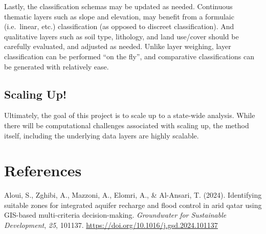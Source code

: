 \documentclass[
]{agujournal2019}
\newlength{\cslhangindent}
\newenvironment{CSLReferences}[2] %
 {\begin{list}{}{%
  \setlength{\itemindent}{0pt}
  \setlength{\leftmargin}{0pt}
  \setlength{\parsep}{0pt}
  \ifodd #1
   \setlength{\leftmargin}{\cslhangindent}
   \setlength{\itemindent}{-1\cslhangindent}
  \fi
  \setlength{\itemsep}{#2\baselineskip}}}
 {\end{list}}
\begin{document}
Lastly, the classification schemas may be updated as needed. Continuous
thematic layers such as slope and elevation, may benefit from a
formulaic (i.e.~linear, etc.) classification (as opposed to discreet
classification). And qualitative layers such as soil type, lithology,
and land use/cover should be carefully evaluated, and adjusted as
needed. Unlike layer weighing, layer classification can be performed
``on the fly'', and comparative classifications can be generated with
relatively ease.

\subsection{Scaling Up!}\label{scaling-up}

Ultimately, the goal of this project is to scale up to a state-wide
analysis. While there will be computational challenges associated with
scaling up, the method itself, including the underlying data layers are
highly scalable.

\section*{References}\label{references}

\label{refs}
\begin{CSLReferences}{1}{0}
\vspace{1em}

Aloui, S., Zghibi, A., Mazzoni, A., Elomri, A., \& Al-Ansari, T. (2024).
Identifying suitable zones for integrated aquifer recharge and flood
control in arid qatar using GIS-based multi-criteria decision-making.
\emph{Groundwater for Sustainable Development}, \emph{25}, 101137.
\url{https://doi.org/10.1016/j.gsd.2024.101137}

\end{CSLReferences}
\end{document}
